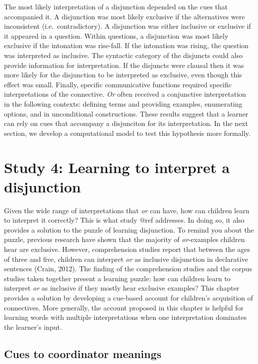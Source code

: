 \documentclass[floatsintext,man]{apa6}
\theoremstyle{definition}
\theoremstyle{definition}
\theoremstyle{definition}
\theoremstyle{remark}
\begin{document}
The most likely interpretation of a disjunction depended on the cues
that accompanied it. A disjunction was most likely exclusive if the
alternatives were inconsistent (i.e.~contradictory). A disjunction was
either inclusive or exclusive if it appeared in a question. Within
questions, a disjunction was most likely exclusive if the intonation was
rise-fall. If the intonation was rising, the question was interpreted as
inclusive. The syntactic category of the disjuncts could also provide
information for interpretation. If the disjuncts were clausal then it
was more likely for the disjunction to be interpreted as exclusive, even
though this effect was small. Finally, specific communicative functions
required specific interpretations of the connective. \emph{Or} often
received a conjunctive interpretation in the following contexts:
defining terms and providing examples, enumerating options, and in
unconditional constructions. These results suggest that a learner can
rely on cues that accompany a disjunciton for its interpretation. In the
next section, we develop a computational model to test this hypothesis
more formally.

\section{Study 4: Learning to interpret a
disjunction}\label{study-4-learning-to-interpret-a-disjunction}

Given the wide range of interpretations that \emph{or} can have, how can
children learn to interpret it correctly? This is what study @ref
addresses. In doing so, it also provides a solution to the puzzle of
learning disjunction. To remind you about the puzzle, previous research
have shown that the majority of \emph{or}-examples children hear are
exclusive. However, comprehension studies report that between the ages
of three and five, children can interpret \emph{or} as inclusive
disjunction in declarative sentences (Crain, 2012). The finding of the
comprehension studies and the corpus studies taken together present a
learning puzzle: how can children learn to interpret \emph{or} as
inclusive if they mostly hear exclusive examples? This chapter provides
a solution by developing a cue-based account for children's acquisition
of connectives. More generally, the account proposed in this chapter is
helpful for learning words with multiple interpretations when one
interpretation dominates the learner's input.

\subsection{Cues to coordinator
meanings}\label{cues-to-coordinator-meanings}
\end{document}
